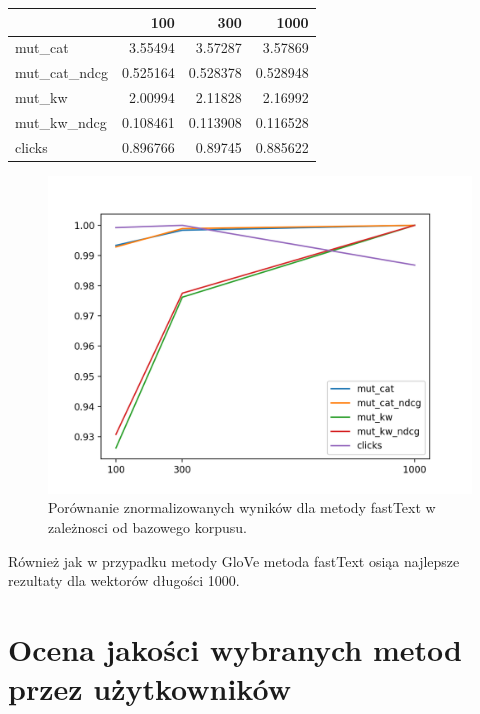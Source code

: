 \documentclass[pl]{minipw} %
\begin{document}
\begin{center}
	\begin{tabular}{lrrr}
		\hline
		&      100 &      300 &     1000 \\
		\hline
		mut\_cat      & 3.55494  & 3.57287  & 3.57869  \\
		mut\_cat\_ndcg & 0.525164 & 0.528378 & 0.528948 \\
		mut\_kw       & 2.00994  & 2.11828  & 2.16992  \\
		mut\_kw\_ndcg  & 0.108461 & 0.113908 & 0.116528 \\
		clicks       & 0.896766 & 0.89745  & 0.885622 \\
		\hline
	\end{tabular}
\end{center}

\begin{figure}[H]
	\centering
	\includegraphics[width=1\textwidth]{img/results/ft_ctr.png}
	\caption{Porównanie znormalizowanych wyników dla metody fastText w zależnosci od bazowego korpusu.}
\end{figure}

Również jak w przypadku metody GloVe metoda fastText osiąa najlepsze rezultaty dla wektorów długości 1000.

\section{Ocena jakości wybranych metod przez użytkowników}
\end{document}
